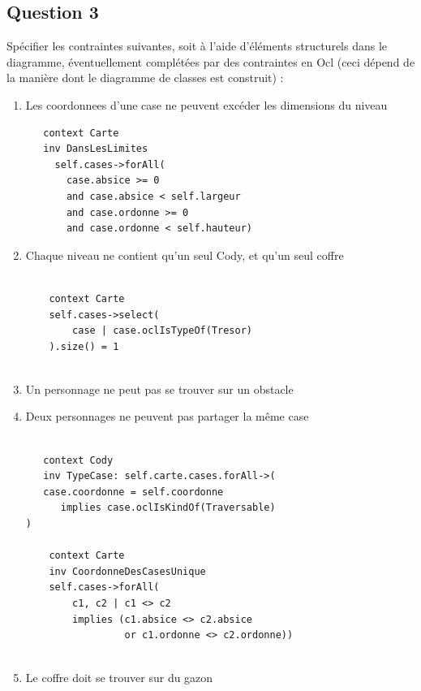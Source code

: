 \documentclass[11pt]{article}
\begin{document}
\subsection{Question 3}
Spécifier les contraintes suivantes, soit à l'aide d'éléments structurels dans le diagramme, éventuellement complétées par des contraintes en Ocl (ceci dépend de la manière dont le diagramme de classes est construit) :

\begin{enumerate}
 
 \item Les coordonnees d'une case ne peuvent excéder les dimensions du niveau
 
 \begin{verbatim}
   context Carte
   inv DansLesLimites
     self.cases->forAll(
       case.absice >= 0
       and case.absice < self.largeur
       and case.ordonne >= 0
       and case.ordonne < self.hauteur)
 \end{verbatim}
  
  \item Chaque niveau ne contient qu'un seul Cody, et qu'un seul coffre
  
  \begin{verbatim}
    
    context Carte
    self.cases->select(
        case | case.oclIsTypeOf(Tresor)
    ).size() = 1    
    
  \end{verbatim}    
  
  \item Un personnage ne peut pas se trouver sur un obstacle 
  
  \item Deux personnages ne peuvent pas partager la même case
  
  \begin{verbatim}
    
   context Cody
   inv TypeCase: self.carte.cases.forAll->(
   case.coordonne = self.coordonne 
      implies case.oclIsKindOf(Traversable)
)    
    
    context Carte
    inv CoordonneDesCasesUnique
    self.cases->forAll(
        c1, c2 | c1 <> c2 
        implies (c1.absice <> c2.absice 
                 or c1.ordonne <> c2.ordonne))    
    
  \end{verbatim}     
  
  \item Le coffre doit se trouver sur du gazon
  

\end{enumerate}
\end{document}
